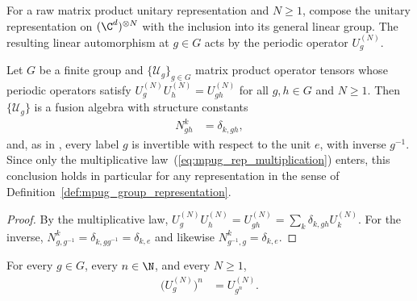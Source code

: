 \begin{definition}
    \label{def:mpug_general_linear_representation}
    \leanok
    For a raw matrix product unitary representation and $N\geq1$, compose
    the unitary representation on $(\C^d)^{\otimes N}$ with the inclusion
    into its general linear group. The resulting linear automorphism at
    $g\in G$ acts by the periodic operator $U_g^{(N)}$.
\end{definition}



\begin{lemma}
    \label{thm:mpug_group_fusion_rules}
    \leanok
    Let $G$ be a finite group and $\{\mathcal U_g\}_{g\in G}$ matrix product
    operator tensors whose periodic operators satisfy
    $U_g^{(N)}U_h^{(N)}=U_{gh}^{(N)}$ for all $g,h\in G$ and $N\geq1$. Then
    $\{\mathcal U_g\}$ is a fusion algebra with structure constants
    \begin{align}
        N_{gh}^k & =\delta_{k,gh},
        \label{eq:mpug_group_fusion_rules}
    \end{align}
    and, as in \cite[Section~4]{GarreRubio2023MPOSym}, every label $g$ is
    invertible with respect to the unit $e$, with inverse $g^{-1}$. Since only
    the multiplicative law~(\ref{eq:mpug_rep_multiplication}) enters, this
    conclusion holds in particular for any representation in the sense of
    Definition~\ref{def:mpug_group_representation}.
\end{lemma}

\begin{proof}
    \leanok
    By the multiplicative law,
    $U_g^{(N)}U_h^{(N)}=U_{gh}^{(N)}=\sum_k\delta_{k,gh}U_k^{(N)}$. For the
    inverse, $N_{g,g^{-1}}^k=\delta_{k,gg^{-1}}=\delta_{k,e}$ and likewise
    $N_{g^{-1},g}^k=\delta_{k,e}$.
\end{proof}

\begin{lemma}
    \label{thm:mpug_operator_power}
    \leanok
    For every $g\in G$, every $n\in\N$, and every $N\geq1$,
    \begin{align}
        \bigl(U_g^{(N)}\bigr)^n & =U_{g^n}^{(N)}.
        \label{eq:mpug_operator_power}
    \end{align}
\end{lemma}


